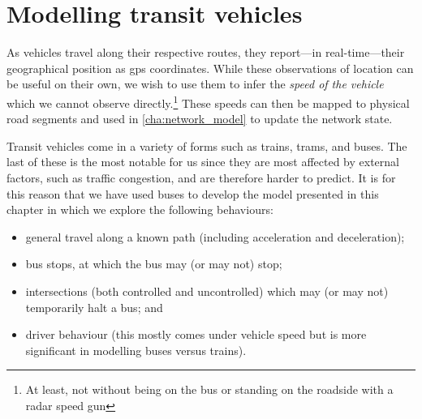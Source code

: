 
\chapter{Modelling transit vehicles}
\label{cha:vehicle_model}

As vehicles travel along their respective routes, they report---in real-time---their geographical position as \gls{gps} coordinates. While these observations of location can be useful on their own, we wish to use them to infer the \emph{speed of the vehicle} which we cannot observe directly.\footnote{At least, not without being on the bus or standing on the roadside with a radar speed gun} These speeds can then be mapped to physical road segments and used in \cref{cha:network_model} to update the network state.

Transit vehicles come in a variety of forms such as trains, trams, and buses. The last of these is the most notable for us since they are most affected by external factors, such as traffic congestion, and are therefore harder to predict. It is for this reason that we have used buses to develop the model presented in this chapter in which we explore the following behaviours:
\begin{itemize}
\item general travel along a known path (including acceleration and deceleration);
\item bus stops, at which the bus may (or may not) stop;
\item intersections (both controlled and uncontrolled) which may (or may not) temporarily halt a bus; and
\item driver behaviour (this mostly comes under vehicle speed but is more significant in modelling buses versus trains).
\end{itemize}


